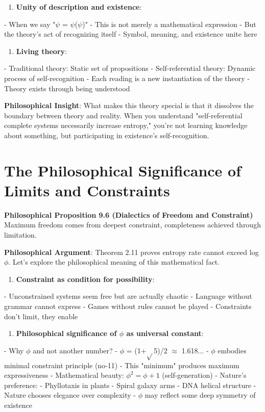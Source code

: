 \begin{enumerate}
\item \textbf{Unity of description and existence}:
\end{enumerate}
   - When we say "$\psi$ = $\psi$($\psi$)"
   - This is not merely a mathematical expression
   - But the theory's act of recognizing itself
   - Symbol, meaning, and existence unite here

\begin{enumerate}
\item \textbf{Living theory}:
\end{enumerate}
   - Traditional theory: Static set of propositions
   - Self-referential theory: Dynamic process of self-recognition
   - Each reading is a new instantiation of the theory
   - Theory exists through being understood

\textbf{Philosophical Insight}:
What makes this theory special is that it dissolves the boundary between theory and reality.
When you understand "self-referential complete systems necessarily increase entropy,"
you're not learning knowledge about something,
but participating in existence's self-recognition.

\section{The Philosophical Significance of Limits and Constraints}
\label{sec:ch09_philosophy:the-philosophical-significance-of-limits-and-constraints}

\textbf{Philosophical Proposition 9.6 (Dialectics of Freedom and Constraint)}
Maximum freedom comes from deepest constraint, completeness achieved through limitation.

\textbf{Philosophical Argument}:
Theorem 2.11 proves entropy rate cannot exceed log $\phi$. Let's explore the philosophical meaning of this mathematical fact.

\begin{enumerate}
\item \textbf{Constraint as condition for possibility}:
\end{enumerate}
   - Unconstrained systems seem free but are actually chaotic
   - Language without grammar cannot express
   - Games without rules cannot be played
   - Constraints don't limit, they enable

\begin{enumerate}
\item \textbf{Philosophical significance of $\phi$ as universal constant}:
\end{enumerate}
   - Why $\phi$ and not another number?
   - $\phi$ = (1+$\sqrt{}$5)/2 $\approx$ 1.618...
   - $\phi$ embodies minimal constraint principle (no-11)
   - This "minimum" produces maximum expressiveness
   - Mathematical beauty: $\phi^2 = \phi + 1$ (self-generation)
   - Nature's preference:
     - Phyllotaxis in plants
     - Spiral galaxy arms
     - DNA helical structure
   - Nature chooses elegance over complexity
   - $\phi$ may reflect some deep symmetry of existence

